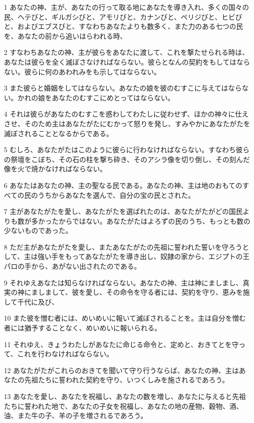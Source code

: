 \par 1 あなたの神、主が、あなたの行って取る地にあなたを導き入れ、多くの国々の民、ヘテびと、ギルガシびと、アモリびと、カナンびと、ペリジびと、ヒビびと、およびエブスびと、すなわちあなたよりも数多く、また力のある七つの民を、あなたの前から追いはらわれる時、
\par 2 すなわちあなたの神、主が彼らをあなたに渡して、これを撃たせられる時は、あなたは彼らを全く滅ぼさなければならない。彼らとなんの契約をもしてはならない。彼らに何のあわれみをも示してはならない。
\par 3 また彼らと婚姻をしてはならない。あなたの娘を彼のむすこに与えてはならない。かれの娘をあなたのむすこにめとってはならない。
\par 4 それは彼らがあなたのむすこを惑わしてわたしに従わせず、ほかの神々に仕えさせ、そのため主はあなたがたにむかって怒りを発し、すみやかにあなたがたを滅ぼされることとなるからである。
\par 5 むしろ、あなたがたはこのように彼らに行わなければならない。すなわち彼らの祭壇をこぼち、その石の柱を撃ち砕き、そのアシラ像を切り倒し、その刻んだ像を火で焼かなければならない。
\par 6 あなたはあなたの神、主の聖なる民である。あなたの神、主は地のおもてのすべての民のうちからあなたを選んで、自分の宝の民とされた。
\par 7 主があなたがたを愛し、あなたがたを選ばれたのは、あなたがたがどの国民よりも数が多かったからではない。あなたがたはよろずの民のうち、もっとも数の少ないものであった。
\par 8 ただ主があなたがたを愛し、またあなたがたの先祖に誓われた誓いを守ろうとして、主は強い手をもってあなたがたを導き出し、奴隷の家から、エジプトの王パロの手から、あがない出されたのである。
\par 9 それゆえあなたは知らなければならない。あなたの神、主は神にましまし、真実の神にましまして、彼を愛し、その命令を守る者には、契約を守り、恵みを施して千代に及び、
\par 10 また彼を憎む者には、めいめいに報いて滅ぼされることを。主は自分を憎む者には猶予することなく、めいめいに報いられる。
\par 11 それゆえ、きょうわたしがあなたに命じる命令と、定めと、おきてとを守って、これを行わなければならない。
\par 12 あなたがたがこれらのおきてを聞いて守り行うならば、あなたの神、主はあなたの先祖たちに誓われた契約を守り、いつくしみを施されるであろう。
\par 13 あなたを愛し、あなたを祝福し、あなたの数を増し、あなたに与えると先祖たちに誓われた地で、あなたの子女を祝福し、あなたの地の産物、穀物、酒、油、また牛の子、羊の子を増されるであろう。

